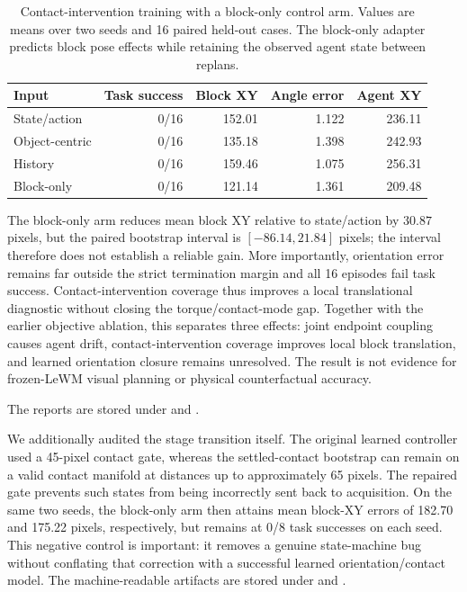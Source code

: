 \documentclass{article}
\begin{document}
\begin{table}[H]
\centering
\scriptsize
\setlength{\tabcolsep}{4pt}
\caption{Contact-intervention training with a block-only control arm. Values
are means over two seeds and 16 paired held-out cases. The block-only adapter
predicts block pose effects while retaining the observed agent state between
replans.}
\label{tab:supp-contact-intervention-closure}
\begin{tabular}{lrrrr}
\toprule
Input & Task success & Block XY & Angle error & Agent XY \\
\midrule
State/action & 0/16 & 152.01 & 1.122 & 236.11 \\
Object-centric & 0/16 & 135.18 & 1.398 & 242.93 \\
History & 0/16 & 159.46 & 1.075 & 256.31 \\
Block-only & 0/16 & 121.14 & 1.361 & 209.48 \\
\bottomrule
\end{tabular}
\end{table}

The block-only arm reduces mean block XY relative to state/action by $30.87$
pixels, but the paired bootstrap interval is $[-86.14,21.84]$ pixels; the
interval therefore does not establish a reliable gain.  More importantly,
orientation error remains far outside the strict termination margin and all
16 episodes fail task success.  Contact-intervention coverage thus improves a
local translational diagnostic without closing the torque/contact-mode gap.
Together with the earlier objective ablation, this separates three effects:
joint endpoint coupling causes agent drift, contact-intervention coverage
improves local block translation, and learned orientation closure remains
unresolved.  The result is not evidence for frozen-LeWM visual planning or
physical counterfactual accuracy.

The reports are stored under
and
.

We additionally audited the stage transition itself.  The original learned
controller used a 45-pixel contact gate, whereas the settled-contact bootstrap
can remain on a valid contact manifold at distances up to approximately 65
pixels.  The repaired gate prevents such states from being incorrectly sent
back to acquisition.  On the same two seeds, the block-only arm then attains
mean block-XY errors of 182.70 and 175.22 pixels, respectively, but remains at
0/8 task successes on each seed.  This negative control is important: it
removes a genuine state-machine bug without conflating that correction with a
successful learned orientation/contact model.  The machine-readable artifacts
are stored under
and
.
\end{document}
